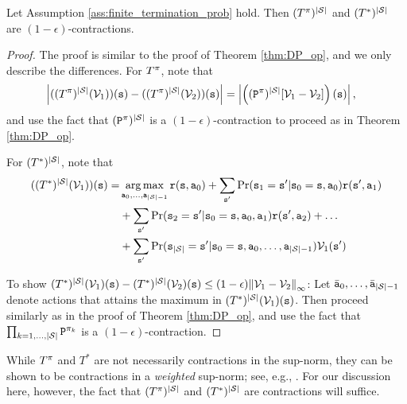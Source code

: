 \begin{theorem}
    Let Assumption \ref{ass:finite_termination_prob} hold. Then $(T^{\pi})^{|\mathcal{S}|}$ and $(T^*)^{|\mathcal{S}|}$ are $(1-\epsilon)$-contractions.
\end{theorem}
\begin{proof}
The proof is similar to the proof of Theorem \ref{thm:DP_op}, and we only describe the differences. For $T^\pi$, note that 
    \begin{align*}
    \left| ((T^{\pi})^{|\mathcal{S}|} (\mathcal{V}_1))({\tt s}) - ((T^{\pi})^{|\mathcal{S}|} (\mathcal{V}_2))({\tt s}) \right| &= \left| \left(({\tt P}^\pi)^{|\mathcal{S}|}[\mathcal{V}_1 - \mathcal{V}_2]\right)({\tt s})  \right|,
    \end{align*}
and use the fact that $({\tt P}^\pi)^{|\mathcal{S}|}$ is a $(1-\epsilon)$-contraction to proceed as in Theorem \ref{thm:DP_op}.

For $(T^*)^{|\mathcal{S}|}$, note that
\begin{equation*}
\begin{split}
    ((T^*)^{|\States|}(\Value_1))(\state) = &\argmax_{\action_0,\dots,\action_{|\States|-1}} \reward(\state,\action_0) + \sum_{\state'}\Pr(\state_1=\state'|\state_0=\state,\action_0)\reward(\state',\action_1) \\
    &+ \sum_{\state'}\Pr(\state_2=\state'|\state_0=\state,\action_0,\action_1)\reward(\state',\action_2) + \dots \\
    &+ \sum_{\state'}\Pr(\state_{|\States|}=\state'|\state_0=\state,\action_0,\dots,\action_{|\States|-1})\Value_1(\state') 
\end{split}
\end{equation*}

To show $(T^*)^{|\mathcal{S}|}({\mathcal{V}_1})({\tt s}) - (T^*)^{|\mathcal{S}|}({\mathcal{V}_2})({\tt s})
\le (1-\epsilon) {\left\| {{\mathcal{V}_1} - {\mathcal{V}_2}} \right\|_\infty }$:
Let $\bar {{\tt a}}_0,\dots,\bar {{\tt a}}_{|\mathcal{S}|-1}$ denote actions that attains the maximum in
$(T^*)^{|\mathcal{S}|}({\mathcal{V}_1})({\tt s})$.
 Then proceed similarly as in the proof of Theorem \ref{thm:DP_op}, and use the fact that $\prod_{k=1,\dots,|\mathcal{S}|} {\tt P}^{\pi_k}$ is a $(1-\epsilon)$-contraction.
\end{proof}

\begin{remark}
    While $T^{\pi}$ and $T^*$ are not necessarily contractions in the sup-norm, they can be shown to be contractions in a \textit{weighted} sup-norm; see, e.g., \cite{Bertsekas05}. For our discussion here, however, the fact that $(T^{\pi})^{|\mathcal{S}|}$ and $(T^*)^{|\mathcal{S}|}$ are contractions will suffice.
\end{remark}


